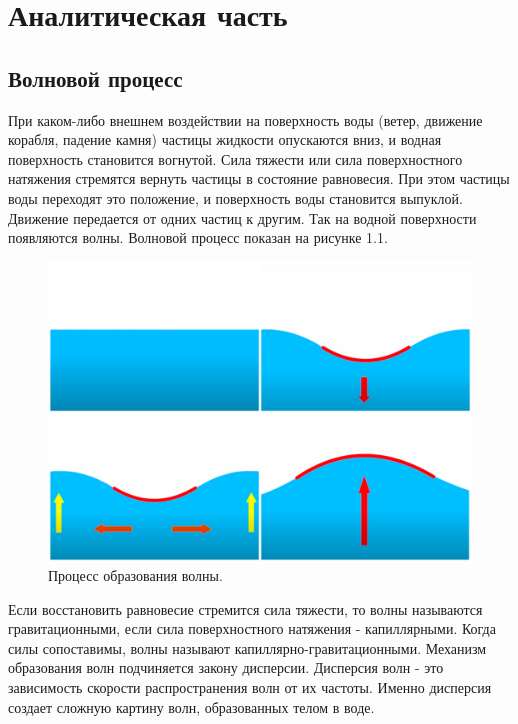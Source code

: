 \chapter{Аналитическая часть}

\section{Волновой процесс}

При каком-либо внешнем воздействии на поверхность воды (ветер, движение корабля, падение камня) частицы жидкости опускаются вниз, и водная поверхность становится вогнутой. Сила тяжести или сила поверхностного натяжения стремятся вернуть частицы в состояние равновесия. При этом частицы воды переходят это положение, и поверхность воды становится выпуклой. Движение передается от одних частиц к другим. Так на водной поверхности появляются волны. Волновой процесс показан на рисунке 1.1.

\begin{figure}[H]
	\begin{center}
		\includegraphics[scale=0.06]{img/wave-process.jpg}
	\end{center}
	\captionsetup{justification=centering}
	\caption{Процесс образования волны.}
	\label{img:wave-process}
\end{figure}

Если восстановить равновесие стремится сила тяжести, то волны называются гравитационными, если сила поверхностного натяжения - капиллярными. Когда силы сопоставимы, волны называют капиллярно-гравитационными. Механизм образования волн подчиняется закону дисперсии. Дисперсия волн - это зависимость скорости распространения волн от их частоты. Именно дисперсия создает сложную картину волн, образованных телом в воде.

